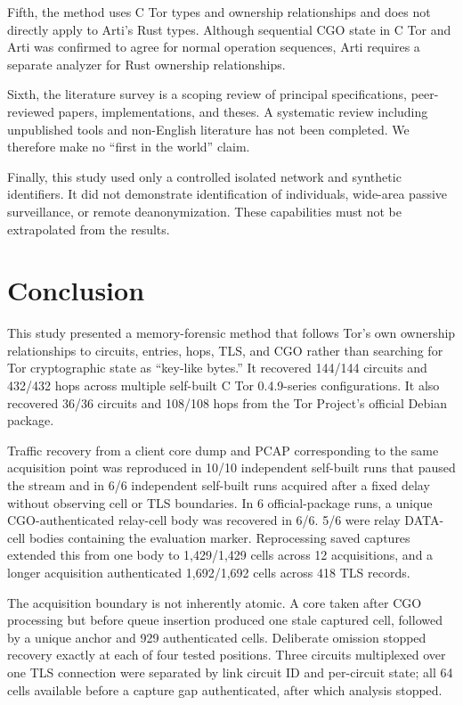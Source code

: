 \documentclass[10pt,a4paper]{article}
\begin{document}
Fifth, the method uses C Tor types and ownership relationships and does not directly apply to Arti's Rust types. Although sequential CGO state in C Tor and Arti was confirmed to agree for normal operation sequences, Arti requires a separate analyzer for Rust ownership relationships.

Sixth, the literature survey is a scoping review of principal specifications, peer-reviewed papers, implementations, and theses. A systematic review including unpublished tools and non-English literature has not been completed. We therefore make no ``first in the world'' claim.

Finally, this study used only a controlled isolated network and synthetic identifiers. It did not demonstrate identification of individuals, wide-area passive surveillance, or remote deanonymization. These capabilities must not be extrapolated from the results.

\section{Conclusion}

This study presented a memory-forensic method that follows Tor's own ownership relationships to circuits, entries, hops, TLS, and CGO rather than searching for Tor cryptographic state as ``key-like bytes.''
It recovered 144/144 circuits and 432/432 hops across multiple self-built C Tor 0.4.9-series configurations. It also recovered 36/36 circuits and 108/108 hops from the Tor Project's official Debian package.

Traffic recovery from a client core dump and PCAP corresponding to the same acquisition point was reproduced in 10/10 independent self-built runs that paused the stream and in 6/6 independent self-built runs acquired after a fixed delay without observing cell or TLS boundaries. In 6 official-package runs, a unique CGO-authenticated relay-cell body was recovered in 6/6. 5/6 were relay DATA-cell bodies containing the evaluation marker. Reprocessing saved captures extended this from one body to 1,429/1,429 cells across 12 acquisitions, and a longer acquisition authenticated 1,692/1,692 cells across 418 TLS records.

The acquisition boundary is not inherently atomic. A core taken after CGO processing but before queue insertion produced one stale captured cell, followed by a unique anchor and 929 authenticated cells. Deliberate omission stopped recovery exactly at each of four tested positions. Three circuits multiplexed over one TLS connection were separated by link circuit ID and per-circuit state; all 64 cells available before a capture gap authenticated, after which analysis stopped.
\end{document}
